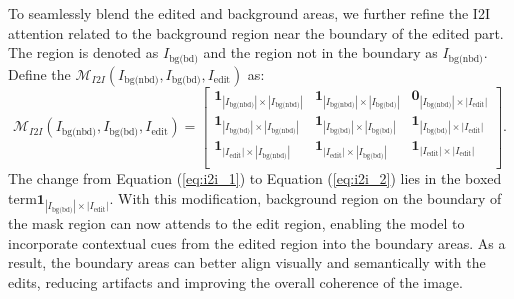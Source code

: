\documentclass{article}
\begin{document}
To seamlessly blend the edited and background areas, we further refine the I2I attention related to the background region near the boundary of the edited part. The region is denoted as ${I}_{\text{bg(bd)}}$ and the region not in the boundary as ${I}_{\text{bg(nbd)}}$. Define the $\mathcal{M}_{I2I}(I_\text{bg(nbd)},I_\text{bg(bd)}, I_\text{edit})$ as:
\begin{equation}
\mathcal{M}_{I2I}(I_\text{bg(nbd)},I_\text{bg(bd)}, I_\text{edit}) =   \begin{bmatrix}
        \mathbf{1}_{|I_\text{bg(nbd)}|\times|I_\text{bg(nbd)}|} &  \mathbf{1}_{|I_\text{bg(nbd)}|\times|I_\text{bg(bd)}|}&\mathbf{0}_{|I_\text{bg(nbd)}|\times|I_\text{edit}|}\\

\mathbf{1}_{|I_\text{bg(bd)}|\times|I_\text{bg(nbd)}|} &  \mathbf{1}_{|I_\text{bg(bd)}|\times|I_\text{bg(bd)}|}&\boxed{\mathbf{1}_{|I_\text{bg(bd)}|\times|I_\text{edit}|}}\\
\mathbf{1}_{|I_\text{edit}|\times|I_\text{bg(nbd)}|} &  \mathbf{1}_{|I_\text{edit}|\times|I_\text{bg(bd)}|}&\mathbf{1}_{|I_\text{edit}|\times|I_\text{edit}|}\\
    \end{bmatrix}.
\label{eq:i2i_2}
\end{equation}
The change from Equation (\ref{eq:i2i_1}) to Equation (\ref{eq:i2i_2}) lies in the boxed term$\boxed{\mathbf{1}_{|I_\text{bg(bd)}|\times|I_\text{edit}|}}$. With this modification, background region on the boundary of the mask region can now attends to the edit region,  enabling the model to  incorporate contextual cues from the edited region into the boundary areas. As a result, the boundary areas can better align visually and semantically with the edits, reducing artifacts and improving the overall coherence of the image.

\end{document}
